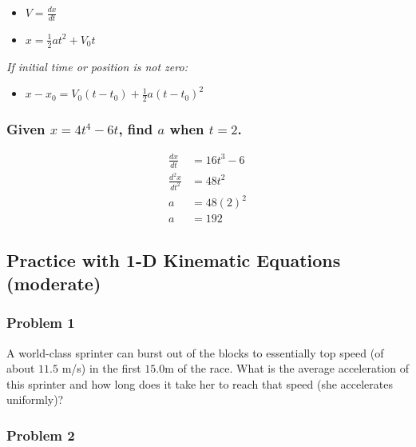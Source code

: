 \documentclass[
  letterpaper,
  DIV=11,
  numbers=noendperiod]{scrartcl}
\providecommand{\tightlist}{%
  \setlength{\itemsep}{0pt}\setlength{\parskip}{0pt}}\usepackage{longtable,booktabs,array}
\begin{document}
\begin{itemize}
\tightlist
\item
  \(V = \frac{dx}{dt}\)
\item
  \(x = \frac{1}{2}at^2 + V_0t\)
\end{itemize}

\emph{If initial time or position is not zero:}

\begin{itemize}
\tightlist
\item
  \(x-x_0 = V_0(t-t_0) + \frac{1}{2}a(t-t_0)^2\)
\end{itemize}

\hypertarget{given-x4t4---6t-find-a-when-t2.}{%
\subsubsection{\texorpdfstring{Given \(x=4t^4 - 6t\), find \(a\) when
\(t=2\).}{Given x=4t\^{}4 - 6t, find a when t=2.}}\label{given-x4t4---6t-find-a-when-t2.}}

\begin{align*}
\frac{dx}{dt} &= 16t^3 - 6 \\
\frac{d^2x}{dt^2} &= 48t^2 \\
a &= 48(2)^2 \\
a &= 192
\end{align*}

\newpage{}

\hypertarget{practice-with-1-d-kinematic-equations-moderate}{%
\subsection{Practice with 1-D Kinematic Equations
(moderate)}\label{practice-with-1-d-kinematic-equations-moderate}}

\hypertarget{problem-1-1}{%
\subsubsection{Problem 1}\label{problem-1-1}}

A world-class sprinter can burst out of the blocks to essentially top
speed (of about \(11.5\) m/s) in the first \(15.0\)m of the race. What
is the average acceleration of this sprinter and how long does it take
her to reach that speed (she accelerates uniformly)?

\hypertarget{problem-2-1}{%
\subsubsection{Problem 2}\label{problem-2-1}}
\end{document}
